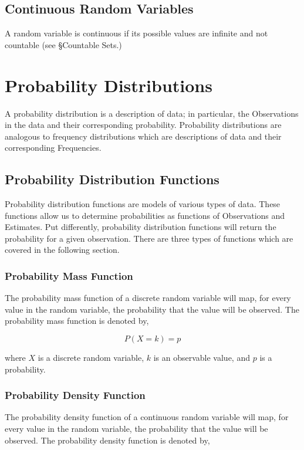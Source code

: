 \documentclass{article}
\begin{document}
\subsection{Continuous Random Variables}
A random variable is continuous if its possible values are infinite and not countable (see §Countable Sets.)

\newpage
\section{Probability Distributions}
A probability distribution is a description of data; in particular, the Observations in the data and their corresponding probability. Probability distributions are analogous to frequency distributions which are descriptions of data and their corresponding Frequencies.

\subsection{Probability Distribution Functions}
Probability distribution functions are models of various types of data. These functions allow us to determine probabilities as functions of Observations and Estimates. Put differently, probability distribution functions will return the probability for a given observation. There are three types of functions which are covered in the following section.

\subsubsection{Probability Mass Function}
The probability mass function of a discrete random variable will map, for every value in the random variable, the probability that the value will be observed. The probability mass function is denoted by,

$$
P(X=k) = p
$$

where $X$ is a discrete random variable, $k$ is an observable value, and $p$ is a probability.

\subsubsection{Probability Density Function}
The probability density function of a continuous random variable will map, for every value in the random variable, the probability that the value will be observed. The probability density function is denoted by,
\end{document}
